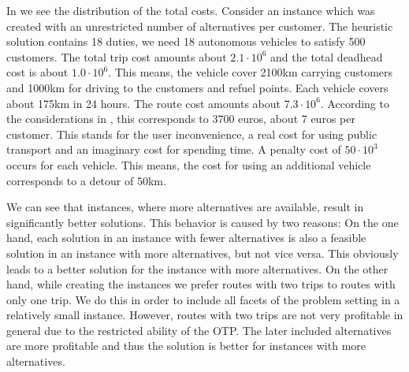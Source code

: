 In  we see the distribution of the total costs. Consider an instance which was created with an unrestricted number of alternatives per customer. The heuristic solution contains 18 duties, \ie we need 18 autonomous vehicles to satisfy 500 customers. The total trip cost amounts about $2.1\cdot 10^6$ and the total deadhead cost is about $1.0\cdot 10^6$. This means, the vehicle cover 2100km carrying customers and 1000km for driving to the customers and refuel points. Each vehicle covers about 175km in 24 hours. The route cost amounts about $7.3\cdot 10^6$. According to the considerations in , this corresponds to 3700 euros, \ie about 7 euros per customer. This stands for the user inconvenience, \ie a real cost for using public transport and an imaginary cost for spending time. A penalty cost of $50\cdot 10^3$ occurs for each vehicle. This means, the cost for using an additional vehicle corresponds to a detour of 50km. 

We can see that instances, where more alternatives are available, result in significantly better solutions. This behavior is caused by two reasons: On the one hand, each solution in an instance with fewer alternatives is also a feasible solution in an instance with more alternatives, but not vice versa. This obviously leads to a better solution for the instance with more alternatives. On the other hand, while creating the instances we prefer routes with two trips to routes with only one trip. We do this in order to include all facets of the problem setting in a relatively small instance. However, routes with two trips are not very profitable in general due to the restricted ability of the OTP. The later included alternatives are more profitable and thus the solution is better for instances with more alternatives.